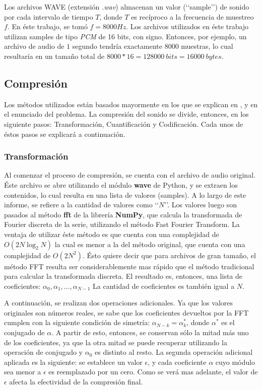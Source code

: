 \documentclass[12pt,a4paper]{article}
\begin{document}
      Los archivos WAVE (extensión \emph{.wav}) almacenan un valor (‘‘sample’’) de sonido por cada intervalo de tiempo $T$, donde $T$ es recíproco a la frecuencia de muestreo $f$.  En éste trabajo, se tomó $f = 8000 Hz$.  Los archivos utilizados en éste trabajo utilizan samples de tipo \emph{PCM} de 16 bits, con signo.  Entonces, por ejemplo, un archivo de audio de $1$ segundo tendría exactamente $8000$ muestras, lo cual resultaría en un tamaño total de $8000 * 16 = 128000\: bits = 16000\: bytes$.

\subsection{Compresión}

      Los métodos utilizados están basados mayormente en los que se explican en \cite{rajesh}, y en el enunciado del problema.  La compresión del sonido se divide, entonces, en los siguiente pasos: Transformación, Cuantificación y Codificación.  Cada unos de éstos pasos se explicará a continuación.

\subsubsection{Transformación}

      Al comenzar el proceso de compresión, se cuenta con el archivo de audio original.  Éste archivo se abre utilizando el módulo \textbf{wave} de Python, y se extraen los contenidos, lo cual resulta en una lista de valores (samples).  A lo largo de este informe, se refiere a la cantidad de valores como ‘‘$N$’’. Los valores luego son pasados al método \textbf{fft} de la librería \textbf{NumPy}, que calcula la transformada de Fourier discreta de la serie, utilizando el método Fast Fourier Transform.  La ventaja de utilizar éste método es que cuenta con una complejidad de $O(2N\log_2 N)$ la cual es menor a la del método original, que cuenta con una complejidad de $O(2N^2)$.  Ésto quiere decir que para archivos de gran tamaño, el método FFT resulta ser considerablemente mas rápido que el método tradicional para calcular la transformada discreta.  El resultado es, entonces, una lista de coeficientes: $\alpha_0, \alpha_1, ..., \alpha_{N-1}$  La cantidad de coeficientes es también igual a $N$.

      A continuación, se realizan dos operaciones adicionales.  Ya que los valores originales son números reales, se sabe que los coeficientes devueltos por la FFT cumplen con la siguiente condición de simetría: $\alpha_{N-k} = \alpha^{*}_k$, donde $\alpha^{*}$ es el conjugado de $\alpha$.  A partir de esto, entonces, se conservan sólo la mitad más uno de los coeficientes, ya que la otra mitad se puede recuperar utilizando la operación de conjugado y $\alpha_0$ es distinto al resto.  La segunda operación adicional aplicada es la siguiente: se establece un valor $\epsilon$, y cada coeficiente $\alpha$ cuyo módulo sea menor a $\epsilon$ es reemplazado por un cero.  Como se verá mas adelante, el valor de $\epsilon$ afecta la efectividad de la compresión final.
\end{document}
